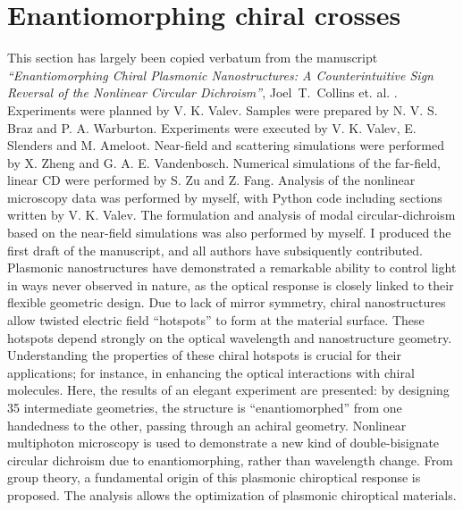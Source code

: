 \section{Enantiomorphing chiral crosses}\label{sec:results:EnantiomorphingChiralCrosses}
This section has largely been copied verbatum from the manuscript \textit{``Enantiomorphing Chiral Plasmonic Nanostructures: A Counterintuitive Sign Reversal of the Nonlinear Circular Dichroism''}, Joel~T.~Collins et. al. \cite{Collins2018}. 
Experiments were planned by V. K. Valev. Samples were prepared by N. V. S. Braz and P. A. Warburton. Experiments were executed by V. K. Valev, E. Slenders and M. Ameloot. Near-field and scattering simulations were performed by X. Zheng and G. A. E. Vandenbosch. Numerical simulations of the far-field, linear CD were performed by S. Zu and Z. Fang. 
Analysis of the nonlinear microscopy data was performed by myself, with Python code including sections written by V. K. Valev. The formulation and analysis of modal circular-dichroism based on the near-field simulations was also performed by myself. I produced the first draft of the manuscript, and all authors have subsiquently contributed. 
\\

Plasmonic nanostructures have demonstrated a remarkable ability to control light in ways never observed in nature, as the optical response is closely linked to their flexible geometric design.
Due to lack of mirror symmetry, chiral nanostructures allow twisted electric field “hotspots” to form at the material surface. 
These hotspots depend strongly on the optical wavelength and nanostructure geometry.
Understanding the properties of these chiral hotspots is crucial for their applications; for instance, in enhancing the optical interactions with chiral molecules. 
Here, the results of an elegant experiment are presented: by designing 35 intermediate geometries, the structure is “enantiomorphed” from one handedness to the other, passing through an achiral geometry. 
Nonlinear multiphoton microscopy is used to demonstrate a new kind of double-bisignate circular dichroism due to enantiomorphing, rather than wavelength change.
From group theory, a fundamental origin of this plasmonic chiroptical response is proposed. The analysis allows the optimization of plasmonic chiroptical materials.

